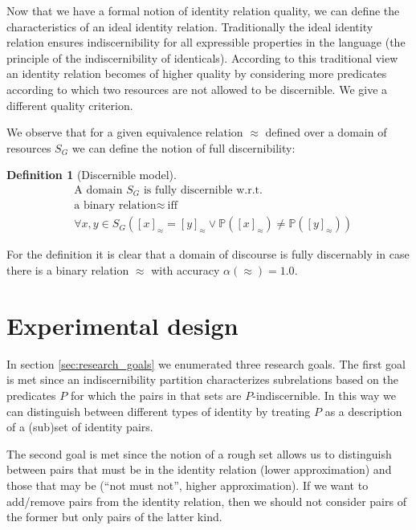 \documentclass[letterpaper]{article}
\newtheorem{definition}{Definition}
\begin{document}
Now that we have a formal notion of identity relation quality, we can define the characteristics of an ideal identity relation. Traditionally the ideal identity relation ensures indiscernibility for all expressible properties in the language (the principle of the indiscernibility of identicals). According to this traditional view an identity relation becomes of higher quality by considering more predicates according to which two resources are not allowed to be discernible. We give a different quality criterion.

We observe that for a given equivalence relation $\approx$ defined over a domain of resources $S_G$ we can define the notion of full discernibility:

\begin{definition}[Discernible model]
\label{def:fully_discernible}
\begin{align}
& \text{A domain $S_G$ is fully discernible w.r.t.}
\nonumber
\\
& \text{a binary relation} \approx \  \text{iff}
\nonumber
\\
 & \forall x, y \in S_G (
    [x]_{\approx} = [y]_{\approx}
  \lor
    \mathbb{P}([x]_{\approx}) \neq \mathbb{P}([y]_{\approx})
  )
\end{align}
\end{definition}

For the definition it is clear that a domain of discourse is fully discernably in case there is a binary relation $\approx$ with accuracy $\alpha(\approx) = 1.0$.

\section{Experimental design}
\label{sec:experimental_design}

In section \ref{sec:research_goals} we enumerated three research goals. The first goal is met since an indiscernibility partition characterizes subrelations based on the predicates $P$ for which the pairs in that sets are $P$-indiscernible. In this way we can distinguish between different types of identity by treating $P$ as a description of a (sub)set of identity pairs.

The second goal is met since the notion of a rough set allows us to distinguish between pairs that must be in the identity relation (lower approximation) and those that may be (``not must not'', higher approximation). If we want to add/remove pairs from the identity relation, then we should not consider pairs of the former but only pairs of the latter kind.
\end{document}
